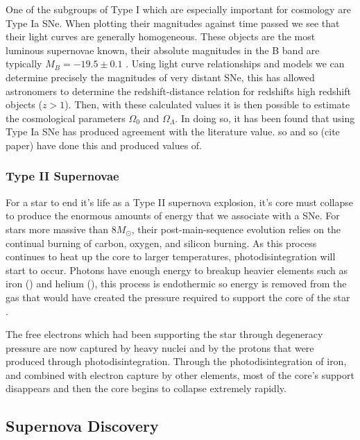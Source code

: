 \documentclass[twocolumn]{revtex4}
\begin{document}
One of the subgroups of Type I which are especially important for cosmology are Type Ia SNe. When plotting their magnitudes against time passed we see that their light curves are generally homogeneous. These objects are the most luminous supernovae known, their absolute magnitudes in the B band are typically $M_B = -19.5 \pm 0.1$ \cite{posn}. Using light curve relationships and models we can determine precisely the magnitudes of very distant SNe, this has allowed astronomers to determine the redshift-distance relation for redshifts high redshift objects ($z>1$). Then, with these calculated values it is then possible to estimate the cosmological parameters $\Omega_0$ and $\Omega_\Lambda$. In doing so, it has been found that using Type Ia SNe has produced agreement with the literature value. so and so (cite paper) have done this and produced values of. 

\vspace{-3ex}
\subsubsection{Type II Supernovae}
\vspace{-2ex}

For a star to end it's life as a Type II supernova explosion, it's core must collapse to produce the enormous amounts of energy that we associate with a SNe. For stars more massive than $8 M_{\odot}$, their post-main-sequence evolution relies on the continual burning of carbon, oxygen, and silicon burning. As this process continues to heat up the core to larger temperatures, photodisintegration will start to occur. Photons have enough energy to breakup heavier elements such as iron () and helium (), this process is endothermic so energy is removed from the gas that would have created the pressure required to support the core of the star \cite{mod_ast}. 

The free electrons which had been supporting the star through degeneracy pressure are now captured by heavy nuclei and by the protons that were produced through photodisintegration. Through the photodisintegration of iron, and combined with electron capture by other elements, most of the core's support disappears and then the core begins to collapse extremely rapidly. 

\vspace{-3ex}
\subsection{Supernova Discovery}
\vspace{-2ex}
\end{document}

